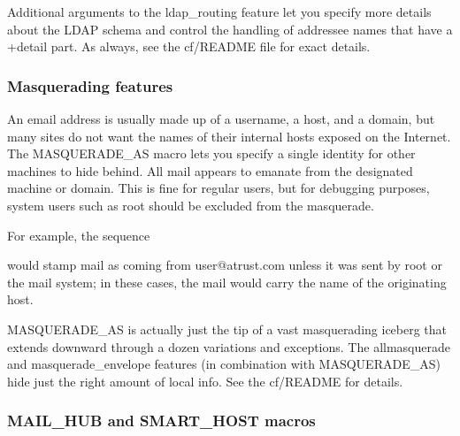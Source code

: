 
Additional arguments to the {ldap\_routing} feature let you specify more
details about the LDAP schema and control the handling of addressee
names that have a {+detail} part. As always, see the {cf/README} file
for exact details.

\subsubsection[Masquerading
features]{\texorpdfstring{Ma\protect\hypertarget{part0026_split_034.htmlux5cux23_idTextAnchor1082}{}{}squerading
features}{Masquerading features}}

\protect\hypertarget{part0026_split_034.htmlux5cux23_idIndexMarker2530}{}{}An
email address is usually made up of a username, a host, and a domain,
but many sites do not want the names of their internal hosts exposed on
the Internet. The
\protect\hypertarget{part0026_split_034.htmlux5cux23_idIndexMarker2531}{}{}{MASQUERADE\_AS}
macro lets you specify a single identity for other machines to hide
behind. All mail appears to emanate from the designated machine or
domain. This is fine for regular users, but for debugging purposes,
system users such as root should be excluded from the masquerade.

For example, the
sequence\protect\hypertarget{part0026_split_034.htmlux5cux23_idIndexMarker2532}{}{}


would stamp mail as coming from user@atrust.com unless it was sent by
root or the mail system; in these cases, the mail would carry the name
of the originating host.

{MASQUERADE\_AS} is actually just the tip of a vast masquerading iceberg
that extends downward through a dozen variations and exceptions. The
{allmasquerade} and {masquerade\_envelope} features (in combination with
{MASQUERADE\_AS}) hide just the right amount of local info. See the
{cf/README} for details.

\subsubsection[ and {SMART\_HOST}
macros]{\texorpdfstring{\protect\hypertarget{part0026_split_034.htmlux5cux23_idTextAnchor1083}{}{}\protect\hypertarget{part0026_split_034.htmlux5cux23_idIndexMarker2533}{}{}{MA\protect\hypertarget{part0026_split_034.htmlux5cux23_idTextAnchor1084}{}{}IL\_HUB}
and
\protect\hypertarget{part0026_split_034.htmlux5cux23_idIndexMarker2534}{}{}{SMART\_HOST}
macros}{MAIL\_HUB and SMART\_HOST macros}}

